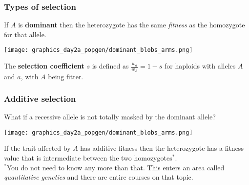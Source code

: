 \documentclass{beamer}
\newcommand{\1}{\ensuremath{\mathbf{1}}}
\begin{document}
%
%
%
\begin{frame}\frametitle{Types of selection}
	If $A$ is \textbf{dominant} then the heterozygote has the same \emph{fitness} as the homozygote for that allele.
	\begin{center}
		\texttt{[image: graphics\_day2a\_popgen/dominant\_blobs\_arms.png]}
	\end{center}
\end{frame}
%
%
%
\begin{frame}
	\begin{block}{}
		The \textbf{selection coefficient} $s$ is defined as $\tfrac{w_a}{w_A} = 1 - s$ for haploids with alleles $A$ and $a$, with $A$ being fitter.
	\end{block}
\end{frame}
%
%
%
\begin{frame}\frametitle{Additive selection}
	What if a recessive allele is not totally masked by the dominant allele?
	\begin{center}
		\texttt{[image: graphics\_day2a\_popgen/dominant\_blobs\_arms.png]}
	\end{center}
	If the trait affected by $A$ has additive fitness then the heterozygote has a fitness value that is intermediate between the two homozygotes$^{*}$.\\[2ex]
	{\scriptsize $^{*}$You do not need to know any more than that. This enters an area called \emph{quantitative genetics} and there are entire courses on that topic.}
\end{frame}
\end{document}
